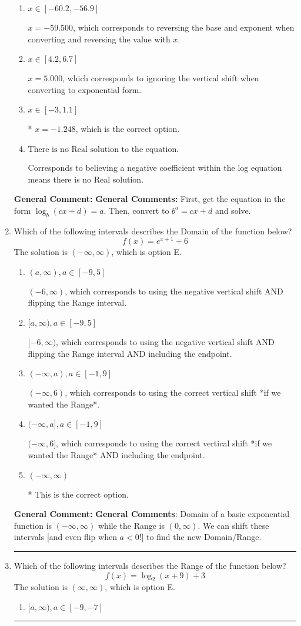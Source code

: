 \documentclass{extbook}[14pt]
\newcommand{\litem}[1]{\item #1

\rule{\textwidth}{0.4pt}}
\begin{document}
\begin{enumerate}
{\begin{enumerate}[label=\Alph*.]
$x = -62.000$, which corresponds to reversing the base and exponent when converting.
\item \( x \in [-60.2, -56.9] \)

$x = -59.500$, which corresponds to reversing the base and exponent when converting and reversing the value with $x$.
\item \( x \in [4.2, 6.7] \)

$x = 5.000$, which corresponds to ignoring the vertical shift when converting to exponential form.
\item \( x \in [-3, 1.1] \)

* $x = -1.248$, which is the correct option.
\item \( \text{There is no Real solution to the equation.} \)

Corresponds to believing a negative coefficient within the log equation means there is no Real solution.
\end{enumerate}

\textbf{General Comment:} \textbf{General Comments:} First, get the equation in the form $\log_b{(cx+d)} = a$. Then, convert to $b^a = cx+d$ and solve.
}
\litem{
Which of the following intervals describes the Domain of the function below?
\[ f(x) = e^{x+1}+6 \]The solution is \( (-\infty, \infty) \), which is option E.\begin{enumerate}[label=\Alph*.]
\item \( (a, \infty), a \in [-9, 5] \)

$(-6, \infty)$, which corresponds to using the negative vertical shift AND flipping the Range interval.
\item \( [a, \infty), a \in [-9, 5] \)

$[-6, \infty)$, which corresponds to using the negative vertical shift AND flipping the Range interval AND including the endpoint.
\item \( (-\infty, a), a \in [-1, 9] \)

$(-\infty, 6)$, which corresponds to using the correct vertical shift *if we wanted the Range*.
\item \( (-\infty, a], a \in [-1, 9] \)

$(-\infty, 6]$, which corresponds to using the correct vertical shift *if we wanted the Range* AND including the endpoint.
\item \( (-\infty, \infty) \)

* This is the correct option.
\end{enumerate}

\textbf{General Comment:} \textbf{General Comments}: Domain of a basic exponential function is $(-\infty, \infty)$ while the Range is $(0, \infty)$. We can shift these intervals [and even flip when $a<0$!] to find the new Domain/Range.
}
\litem{
Which of the following intervals describes the Range of the function below?
\[ f(x) = \log_2{(x+9)}+3 \]The solution is \( (\infty, \infty) \), which is option E.\begin{enumerate}[label=\Alph*.]
\item \( [a, \infty), a \in [-9, -7] \)


\end{enumerate}}
\end{enumerate}
\end{document}
